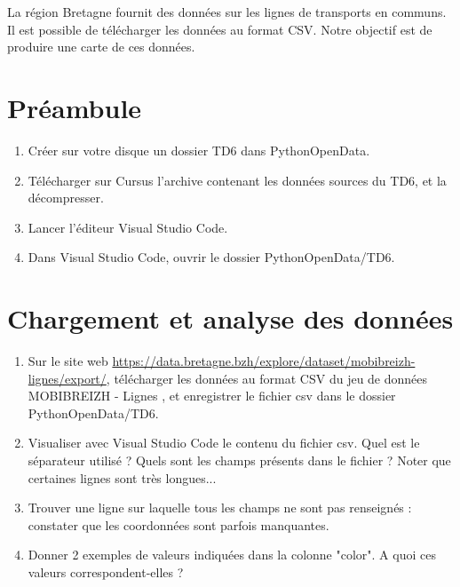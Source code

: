 \documentclass[11pt,a4paper]{article}
\begin{document}
La région Bretagne fournit des données sur les lignes de transports en communs.
Il est possible de télécharger les données au format CSV. Notre objectif est de produire une carte de ces données.


\section*{Préambule}
\begin{enumerate}
    \item Créer sur votre disque un dossier TD6 dans PythonOpenData. 
    \item Télécharger sur Cursus l'archive contenant les données sources du TD6, et la décompresser.
    \item Lancer l'éditeur Visual Studio Code.
    \item Dans Visual Studio Code, ouvrir le dossier PythonOpenData/TD6. 
\end{enumerate}



\section{Chargement et analyse des données}

\begin{enumerate}
    \item Sur le site web \url{https://data.bretagne.bzh/explore/dataset/mobibreizh-lignes/export/}, télécharger les données au format CSV du jeu de données \og MOBIBREIZH - Lignes \fg, et enregistrer le fichier csv dans le dossier PythonOpenData/TD6.
    \item Visualiser avec Visual Studio Code le contenu du fichier csv. Quel est le séparateur utilisé ? Quels sont les champs présents dans le fichier ? Noter que certaines lignes sont très longues...
    \item Trouver une ligne sur laquelle tous les champs ne sont pas renseignés : constater que les coordonnées sont parfois manquantes.
    \item Donner 2 exemples de valeurs indiquées dans la colonne "color". A quoi ces valeurs correspondent-elles ?
   \end{enumerate}
\end{document}
